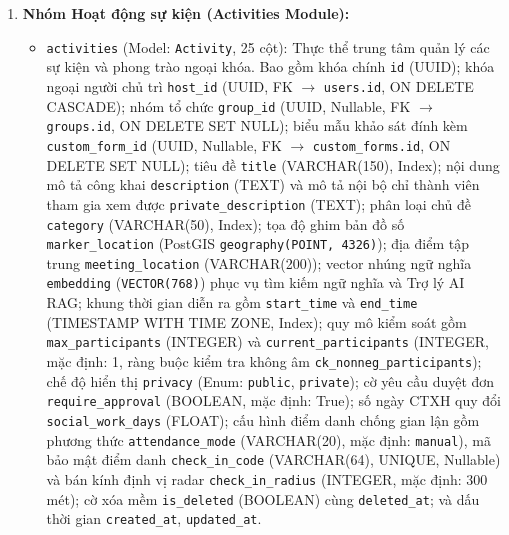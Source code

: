 \begin{enumerate}
    \item \textbf{Nhóm Hoạt động sự kiện (Activities Module):}
    \begin{itemize}
        \item \texttt{activities} (Model: \texttt{Activity}, 25 cột): Thực thể trung tâm quản lý các sự kiện và phong trào ngoại khóa. Bao gồm khóa chính \texttt{id} (UUID); khóa ngoại người chủ trì \texttt{host\_id} (UUID, FK $\rightarrow$ \texttt{users.id}, ON DELETE CASCADE); nhóm tổ chức \texttt{group\_id} (UUID, Nullable, FK $\rightarrow$ \texttt{groups.id}, ON DELETE SET NULL); biểu mẫu khảo sát đính kèm \texttt{custom\_form\_id} (UUID, Nullable, FK $\rightarrow$ \texttt{custom\_forms.id}, ON DELETE SET NULL); tiêu đề \texttt{title} (VARCHAR(150), Index); nội dung mô tả công khai \texttt{description} (TEXT) và mô tả nội bộ chỉ thành viên tham gia xem được \texttt{private\_description} (TEXT); phân loại chủ đề \texttt{category} (VARCHAR(50), Index); tọa độ ghim bản đồ số \texttt{marker\_location} (PostGIS \texttt{geography(POINT, 4326)}); địa điểm tập trung \texttt{meeting\_location} (VARCHAR(200)); vector nhúng ngữ nghĩa \texttt{embedding} (\texttt{VECTOR(768)}) phục vụ tìm kiếm ngữ nghĩa và Trợ lý AI RAG; khung thời gian diễn ra gồm \texttt{start\_time} và \texttt{end\_time} (TIMESTAMP WITH TIME ZONE, Index); quy mô kiểm soát gồm \texttt{max\_participants} (INTEGER) và \texttt{current\_participants} (INTEGER, mặc định: 1, ràng buộc kiểm tra không âm \texttt{ck\_nonneg\_participants}); chế độ hiển thị \texttt{privacy} (Enum: \texttt{public}, \texttt{private}); cờ yêu cầu duyệt đơn \texttt{require\_approval} (BOOLEAN, mặc định: True); số ngày CTXH quy đổi \texttt{social\_work\_days} (FLOAT); cấu hình điểm danh chống gian lận gồm phương thức \texttt{attendance\_mode} (VARCHAR(20), mặc định: \texttt{manual}), mã bảo mật điểm danh \texttt{check\_in\_code} (VARCHAR(64), UNIQUE, Nullable) và bán kính định vị radar \texttt{check\_in\_radius} (INTEGER, mặc định: 300 mét); cờ xóa mềm \texttt{is\_deleted} (BOOLEAN) cùng \texttt{deleted\_at}; và dấu thời gian \texttt{created\_at}, \texttt{updated\_at}.
    \end{itemize}


\end{enumerate}

